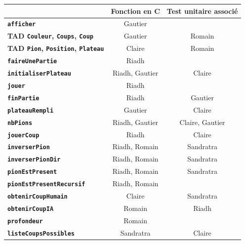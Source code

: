 \documentclass[11pt]{report}
\begin{document}
\begin{table}[h]
\begin{center}
\begin{tabular}{c|c|c|}
  \cline{2-3}
   & \textbf{Fonction en C} & \textbf{Test unitaire associé} \\ \hline
  \multicolumn{1}{|l|}{\textbf{\texttt{afficher}}} & Gautier & \cellcolor{lightgray} \\ \hline
  \multicolumn{1}{|l|}{\textbf{TAD \texttt{Couleur}, \texttt{Coups}, \texttt{Coup}}} & Gautier & Romain \\ \hline
  \multicolumn{1}{|l|}{\textbf{TAD \texttt{Pion}, \texttt{Position}, \texttt{Plateau}}} & Claire & Romain \\ \hline
  \multicolumn{1}{|l|}{\textbf{\texttt{faireUnePartie}}} & Riadh & \cellcolor{lightgray} \\ \hline
  \multicolumn{1}{|l|}{\textbf{\texttt{initialiserPlateau}}} & Riadh, Gautier & Claire \\ \hline
 \multicolumn{1}{|l|}{ \textbf{\texttt{jouer}}} & Riadh & \cellcolor{lightgray} \\ \hline
 \multicolumn{1}{|l|}{ \textbf{\texttt{finPartie}}} & Riadh & Gautier \\ \hline
  \multicolumn{1}{|l|}{\textbf{\texttt{plateauRempli}}} & Gautier & Claire \\ \hline
  \multicolumn{1}{|l|}{\textbf{\texttt{nbPions}}} & Riadh, Gautier & Claire, Gautier \\ \hline
  \multicolumn{1}{|l|}{\textbf{\texttt{jouerCoup}}} & Riadh & Claire \\ \hline
  \multicolumn{1}{|l|}{\textbf{\texttt{inverserPion}}} & Riadh, Romain & Sandratra \\ \hline
  \multicolumn{1}{|l|}{\textbf{\texttt{inverserPionDir}}} & Riadh, Romain & Sandratra\\ \hline
  \multicolumn{1}{|l|}{\textbf{\texttt{pionEstPresent}}} & Riadh, Romain & Sandratra \\ \hline
 \multicolumn{1}{|l|}{ \textbf{\texttt{pionEstPresentRecursif}}} & Riadh, Romain & \cellcolor{lightgray} \\ \hline
  \multicolumn{1}{|l|}{\textbf{\texttt{obtenirCoupHumain}}} & Claire & Sandratra\\ \hline
 \multicolumn{1}{|l|}{ \textbf{\texttt{obtenirCoupIA}}} & Romain & Riadh \\ \hline
  \multicolumn{1}{|l|}{\textbf{\texttt{profondeur}}} & Romain & \cellcolor{lightgray} \\ \hline
  \multicolumn{1}{|l|}{\textbf{\texttt{listeCoupsPossibles}}} & Sandratra & Claire \\ \hline

\end{tabular}
\end{center}
\end{table}
\end{document}
